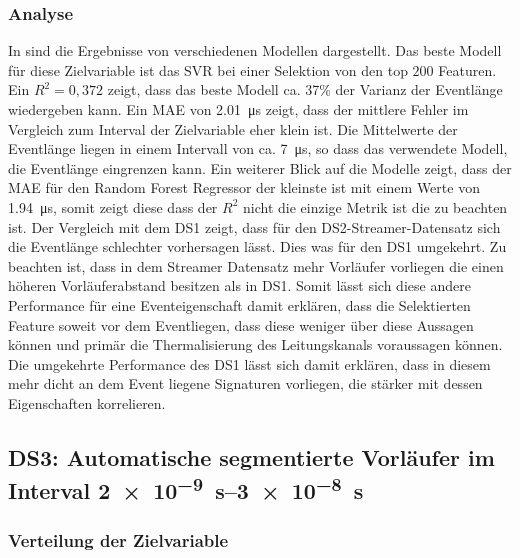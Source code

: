 \subsubsection{Analyse}
In  sind die Ergebnisse von verschiedenen Modellen dargestellt. Das beste Modell für diese Zielvariable ist das SVR bei einer Selektion von den top \(200\) Featuren. Ein \(R^2 = 0,372\) zeigt, dass das beste Modell ca. 37\% der Varianz der Eventlänge wiedergeben kann. Ein MAE von \SI{2,01}{\micro\second} zeigt, dass der mittlere Fehler im Vergleich zum Interval der Zielvariable eher klein ist. Die Mittelwerte der Eventlänge liegen in einem Intervall von ca. \SI{7}{\micro\second}, so dass das verwendete Modell, die Eventlänge eingrenzen kann. Ein weiterer Blick auf die Modelle zeigt, dass der MAE für den Random Forest Regressor der kleinste ist mit einem Werte von \SI{1,94}{\micro\second}, somit zeigt diese dass der \(R^2\) nicht die einzige Metrik ist die zu beachten ist. Der Vergleich mit dem DS1 zeigt, dass für den DS2-Streamer-Datensatz sich die Eventlänge schlechter vorhersagen lässt. Dies was für den DS1 umgekehrt. Zu beachten ist, dass in dem Streamer Datensatz mehr Vorläufer vorliegen die einen höheren Vorläuferabstand besitzen als in DS1. Somit lässt sich diese andere Performance für eine Eventeigenschaft damit erklären, dass die Selektierten Feature soweit vor dem Eventliegen, dass diese weniger über diese Aussagen können und primär die Thermalisierung des Leitungskanals voraussagen können. Die umgekehrte Performance des DS1 lässt sich damit erklären, dass in diesem mehr dicht an dem Event liegene Signaturen vorliegen, die stärker mit dessen Eigenschaften korrelieren.



\subsection{DS3: Automatische segmentierte Vorläufer im Interval \SIrange{2e-9}{3e-8}{\second}}
\label{sec:short_event_duration}

\subsubsection{Verteilung der Zielvariable}

